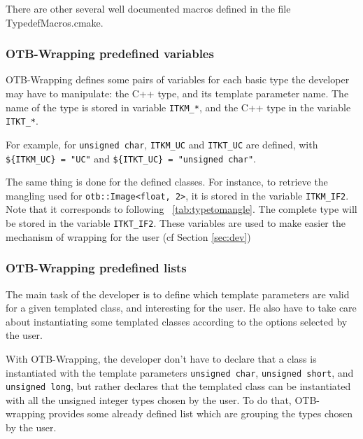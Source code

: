 There are other several well documented macros defined in the file TypedefMacros.cmake.


\subsubsection{OTB-Wrapping predefined variables}
OTB-Wrapping defines some pairs of variables for each basic type the developer may have
to manipulate: the C++ type, and its template parameter name. The name of the type
is stored in variable \verb$ITKM_*$, and the C++ type in the variable \verb$ITKT_*$.

For example, for \verb$unsigned char$, \verb$ITKM_UC$ and \verb$ITKT_UC$
are defined, with \verb|${ITKM_UC} = "UC"|  and \verb|${ITKT_UC} = "unsigned char"|.

The same thing is done for the defined classes. 
For instance, to retrieve the mangling used for  \verb|otb::Image<float, 2>|, 
it is stored in the variable  \verb|ITKM_IF2|.
Note that it corresponds to  following ~\ref{tab:typetomangle}.
The complete type will be stored in the variable \verb?ITKT_IF2?. 
These variables are used to make easier the mechanism of 
wrapping for the user (cf Section \ref{sec:dev})

 \subsubsection{OTB-Wrapping predefined lists}
The main task of the developer is to define which template parameters are valid for a given
templated class, and interesting for the user. He also have to take care about
instantiating some templated classes according to the options selected by the user.


With OTB-Wrapping, the developer don't have to declare that a class is instantiated with the template parameters
\verb$unsigned char$, \verb$unsigned short$, and \verb$unsigned long$, but rather declares that the
templated class can be instantiated with all the unsigned integer types chosen by the user.
To do that, OTB-wrapping provides some already defined list which are grouping the types chosen by
the user.

